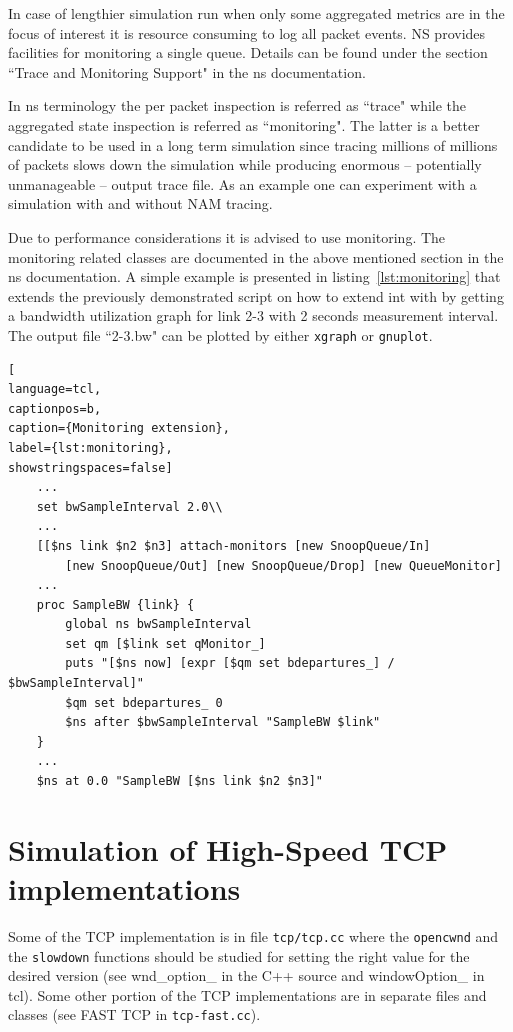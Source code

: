 \documentclass[a4paper]{article}
\begin{document}
In case of lengthier simulation run when only some aggregated metrics are in the focus of interest it is resource consuming to log all packet events. NS provides facilities for monitoring a single queue. Details can be found under the section ``Trace and Monitoring Support" in the ns documentation.

In ns terminology the per packet inspection is referred as ``trace" while the aggregated state inspection is referred as ``monitoring". The latter is a better candidate to be used in a long term simulation since tracing millions of millions of packets slows down the simulation while producing enormous -- potentially unmanageable -- output trace file. As an example one can experiment with a simulation with and without NAM tracing.

Due to performance considerations it is advised to use monitoring. The monitoring related classes are documented in the above mentioned section in the ns documentation. A simple example is presented in listing~\ref{lst:monitoring} that extends the previously demonstrated script on how to extend int with by getting a bandwidth utilization graph for link 2-3 with 2 seconds measurement interval. The output file ``2-3.bw" can be plotted by either \verb!xgraph! or \verb!gnuplot!.

\begin{lstlisting}[
language=tcl,
captionpos=b,
caption={Monitoring extension},
label={lst:monitoring},
showstringspaces=false]
    ...
    set bwSampleInterval 2.0\\
    ...
    [[$ns link $n2 $n3] attach-monitors [new SnoopQueue/In]
        [new SnoopQueue/Out] [new SnoopQueue/Drop] [new QueueMonitor]
    ...
    proc SampleBW {link} {
        global ns bwSampleInterval
        set qm [$link set qMonitor_]
        puts "[$ns now] [expr [$qm set bdepartures_] / $bwSampleInterval]"
        $qm set bdepartures_ 0
        $ns after $bwSampleInterval "SampleBW $link"
    }
    ...
    $ns at 0.0 "SampleBW [$ns link $n2 $n3]"
\end{lstlisting}

\section{Simulation of High-Speed TCP implementations}

Some of the TCP implementation is in file \verb!tcp/tcp.cc! where the \verb!opencwnd! and the \verb!slowdown! functions should be studied for setting the right value for the desired version (see wnd\_option\_ in the C++ source and windowOption\_ in tcl).
Some other portion of the TCP implementations are in separate files and classes (see FAST TCP in \verb!tcp-fast.cc!).
\end{document}
